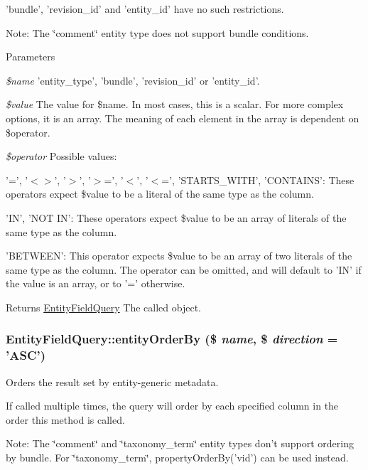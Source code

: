 'bundle', 'revision\_\-id' and 'entity\_\-id' have no such restrictions.

Note: The \char`\"{}comment\char`\"{} entity type does not support bundle conditions.


\begin{DoxyParams}{Parameters}
\item[{\em \$name}]'entity\_\-type', 'bundle', 'revision\_\-id' or 'entity\_\-id'. \item[{\em \$value}]The value for \$name. In most cases, this is a scalar. For more complex options, it is an array. The meaning of each element in the array is dependent on \$operator. \item[{\em \$operator}]Possible values:
\begin{DoxyItemize}
\item '=', '$<$$>$', '$>$', '$>$=', '$<$', '$<$=', 'STARTS\_\-WITH', 'CONTAINS': These operators expect \$value to be a literal of the same type as the column.
\item 'IN', 'NOT IN': These operators expect \$value to be an array of literals of the same type as the column.
\item 'BETWEEN': This operator expects \$value to be an array of two literals of the same type as the column. The operator can be omitted, and will default to 'IN' if the value is an array, or to '=' otherwise.
\end{DoxyItemize}\end{DoxyParams}
\begin{DoxyReturn}{Returns}
\hyperlink{classEntityFieldQuery}{EntityFieldQuery} The called object. 
\end{DoxyReturn}
\hypertarget{classEntityFieldQuery_aaec910a18a4d4d168dcb1f6a004a604e}{
\subsubsection[{entityOrderBy}]{\setlength{\rightskip}{0pt plus 5cm}EntityFieldQuery::entityOrderBy (\$ {\em name}, \/  \$ {\em direction} = {\ttfamily 'ASC'})}}
\label{classEntityFieldQuery_aaec910a18a4d4d168dcb1f6a004a604e}
Orders the result set by entity-\/generic metadata.

If called multiple times, the query will order by each specified column in the order this method is called.

Note: The \char`\"{}comment\char`\"{} and \char`\"{}taxonomy\_\-term\char`\"{} entity types don't support ordering by bundle. For \char`\"{}taxonomy\_\-term\char`\"{}, propertyOrderBy('vid') can be used instead.


